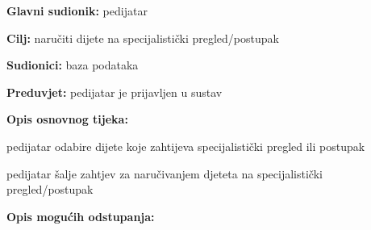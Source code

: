      
                    \noindent {}
					\begin{packed_item}
	
						\item \textbf{Glavni sudionik: }pedijatar
						\item  \textbf{Cilj:} naručiti dijete na specijalistički pregled/postupak
						\item  \textbf{Sudionici:} baza podataka
						\item  \textbf{Preduvjet:} pedijatar je prijavljen u sustav
						\item  \textbf{Opis osnovnog tijeka:}
						
						\item[] \begin{packed_enum}
	
							\item pedijatar odabire dijete koje zahtijeva specijalistički pregled ili postupak
							\item pedijatar šalje zahtjev za naručivanjem djeteta na specijalistički pregled/postupak
							\item 

						\end{packed_enum}
						
						\item  \textbf{Opis mogućih odstupanja:}
						
						\item[] \begin{packed_item}
	
							\item[2.a] 
							\item[] \begin{packed_enum}
								
								\item 
								\item 
							\end{packed_enum}
							
						\end{packed_item}
					\end{packed_item}


